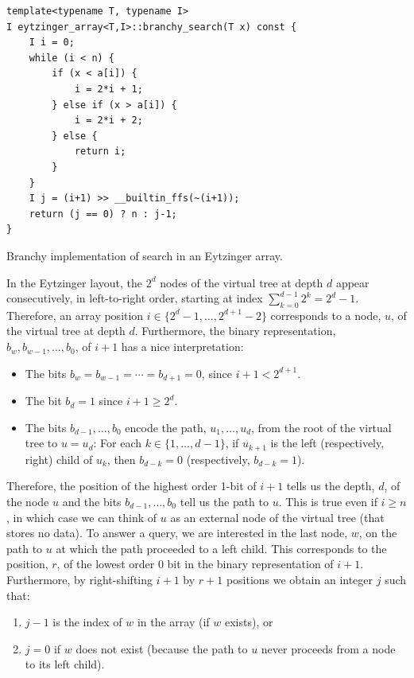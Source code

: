 \documentclass{patmorin}
\newcommand{\lstlabel}[1]{\label{lst:#1}}
\begin{document}
\begin{listing}
\begin{verbatim}
template<typename T, typename I>
I eytzinger_array<T,I>::branchy_search(T x) const {
    I i = 0;
    while (i < n) {
        if (x < a[i]) {
            i = 2*i + 1;
        } else if (x > a[i]) {
            i = 2*i + 2;
        } else {
            return i;
        }
    }
    I j = (i+1) >> __builtin_ffs(~(i+1));
    return (j == 0) ? n : j-1;
}
\end{verbatim}
\caption{Branchy implementation of search in an Eytzinger array.}
\lstlabel{eytzinger-i}
\end{listing}

In the Eytzinger layout, the $2^d$ nodes of the virtual tree at depth $d$
appear consecutively, in left-to-right order, starting at index
$\sum_{k=0}^{d-1}2^k = 2^d-1$.  Therefore, an array position
$i\in\{2^d-1,\ldots,2^{d+1}-2\}$ corresponds to a node, $u$, of the
virtual tree at depth $d$. Furthermore, the binary representation,
$b_w,b_{w-1},\ldots,b_0$, of $i+1$ has a nice interpretation:

\begin{itemize}
  \item The bits $b_w=b_{w-1}=\cdots=b_{d+1}=0$, since $i+1 < 2^{d+1}$.
  \item The bit $b_d=1$ since $i+1\ge 2^d$.
  \item The bits $b_{d-1},\ldots,b_{0}$ encode the path,
    $u_1,\ldots,u_{d}$, from the root of the virtual tree to
    $u=u_{d}$: For each $k\in\{1,\ldots,d-1\}$, if $u_{k+1}$ is the left
    (respectively, right) child of $u_k$, then $b_{d-k}=0$ (respectively,
    $b_{d-k}=1$).
\end{itemize}

Therefore, the position of the highest order 1-bit of $i+1$  tells
us the depth, $d$, of the node $u$ and the bits $b_{d-1},\ldots,b_{0}$ tell
us the path to $u$.  This is true even if $i\ge n$, in which case we
can think of $u$ as an external node of the virtual tree (that stores
no data).  To answer a query, we are interested in the last node,
$w$, on the path to $u$ at which the path proceeded to a left child.
This corresponds to the position, $r$, of the lowest order 0 bit in the
binary representation of $i+1$.  Furthermore, by right-shifting $i+1$
by $r+1$ positions we obtain an integer $j$ such that:

\begin{enumerate}
  \item $j-1$ is the index of $w$ in the array (if $w$ exists), or
  \item $j=0$ if $w$ does not exist (because the path to $u$ never proceeds 
        from a node to its left child).
\end{enumerate}
\end{document}
